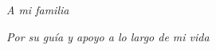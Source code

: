 \pagebreak
\thispagestyle{empty}
\begingroup
{}
\small
\vspace*{7,5cm}



\hfill\textit{A mi familia}\hspace{20pt}


\hfill\textit{Por su guía y apoyo a lo largo de mi vida}\hspace{20pt}


\hfill\textit{}\hspace{35pt}
\endgroup


\pagebreak


\pagebreak
\thispagestyle{empty}
